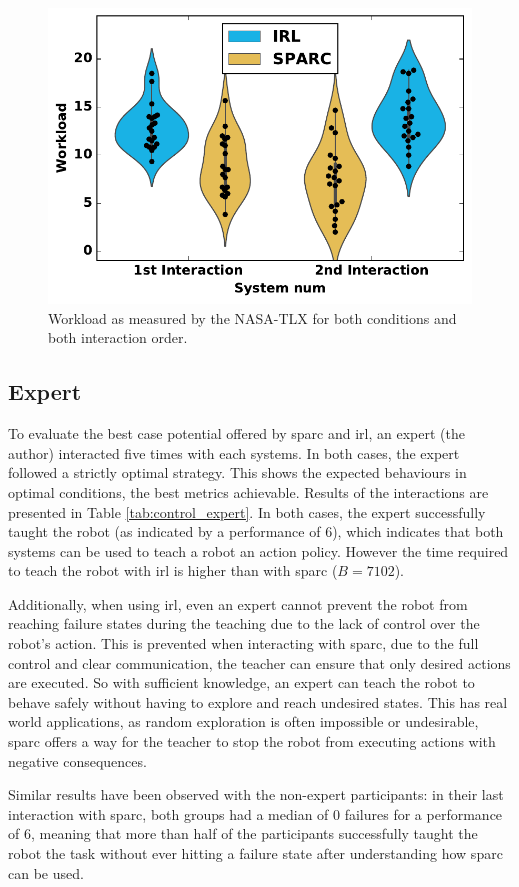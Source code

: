 \begin{figure}[ht]
	\includegraphics[width=.5\textwidth]{workload.pdf}
	\centering
	\caption{Workload as measured by the NASA-TLX for both conditions and both interaction order.
	}
	\label{fig:control_workload}
\end{figure}

\subsection{Expert} \label{ssec:control_expert}

To evaluate the best case potential offered by \gls{sparc} and \gls{irl}, an expert (the author) interacted five times with each systems. In both cases, the expert followed a strictly optimal strategy. This shows the expected behaviours in optimal conditions, the best metrics achievable. Results of the interactions are presented in Table \ref{tab:control_expert}. In both cases, the expert successfully taught the robot (as indicated by a performance of 6), which indicates that both systems can be used to teach a robot an action policy. However the time required to teach the robot with \gls{irl} is higher than with \gls{sparc} ($B=7102$). 

Additionally, when using \gls{irl}, even an expert cannot prevent the robot from reaching failure states during the teaching due to the lack of control over the robot's action. This is prevented when interacting with \gls{sparc}, due to the full control and clear communication, the teacher can ensure that only desired actions are executed. So with sufficient knowledge, an expert can teach the robot to behave safely without having to explore and reach undesired states. This has real world applications, as random exploration is often impossible or undesirable, \gls{sparc} offers a way for the teacher to stop the robot from executing actions with negative consequences.

Similar results have been observed with the non-expert participants: in their last interaction with \gls{sparc}, both groups had a median of 0 failures for a performance of 6, meaning that more than half of the participants successfully taught the robot the task without ever hitting a failure state after understanding how \gls{sparc} can be used.

